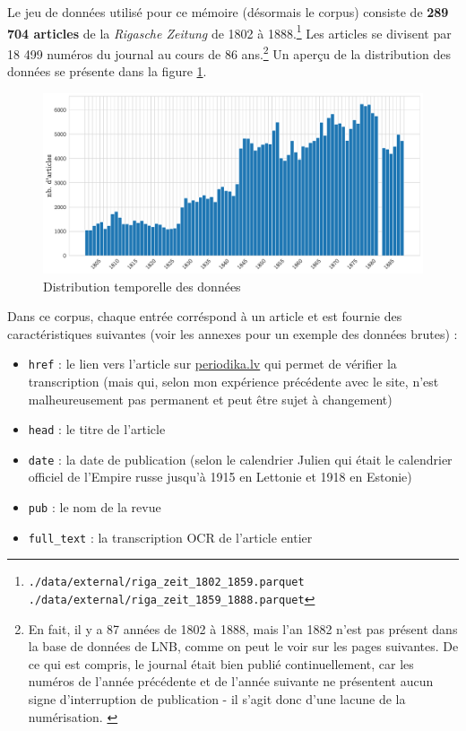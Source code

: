 \documentclass[a4paper,twoside,12pt]{article}
\begin{document}
Le jeu de données utilisé pour ce mémoire (désormais le corpus) consiste de \textbf{289 704 articles} de la \textit{Rigasche Zeitung} de 1802 à 1888.\footnote{\texttt{./data/external/riga\_zeit\_1802\_1859.parquet \newline ./data/external/riga\_zeit\_1859\_1888.parquet}} Les articles se divisent par 18 499 numéros du journal au cours de 86 ans.\footnote{En fait, il y a 87 années de 1802 à 1888, mais l'an 1882 n'est pas présent dans la base de données de LNB, comme on peut le voir sur les pages suivantes. De ce qui est compris, le journal était bien publié continuellement, car les numéros de l'année précédente et de l'année suivante ne présentent aucun signe d'interruption de publication - il s'agit donc d'une lacune de la numérisation. \label{86_years}} Un aperçu de la distribution des données se présente dans la figure \ref{fig:data_hist}.

\begin{figure}[t]
    \centering
    \includegraphics[width=\textwidth]{images/articles_histogram.pdf}
    \caption{Distribution temporelle des données}
    \label{fig:data_hist}
\end{figure}

Dans ce corpus, chaque entrée corréspond à un article et est fournie des caractéristiques suivantes (voir les annexes pour un exemple des données brutes) :

\vspace{1ex}
\begin{itemize}[label=$\bullet$]
    \item \texttt{href} : le lien vers l'article sur \url{periodika.lv} qui permet de vérifier la transcription (mais qui, selon mon expérience précédente avec le site, n'est malheureusement pas permanent et peut être sujet à changement)
    \item \texttt{head} : le titre de l'article
    \item \texttt{date} : la date de publication (selon le calendrier Julien qui était le calendrier officiel de l'Empire russe jusqu'à 1915 en Lettonie et 1918 en Estonie)
    \item \texttt{pub} : le nom de la revue
    \item \texttt{full\_text} : la transcription OCR de l'article entier
    
\end{itemize}
\vspace{1ex}
\end{document}
